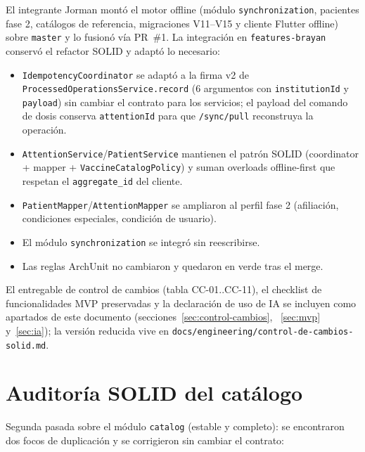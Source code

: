 \documentclass[11pt,a4paper]{article}
\begin{document}
El integrante Jorman montó el motor offline (módulo \texttt{synchronization},
pacientes fase 2, catálogos de referencia, migraciones V11--V15 y cliente
Flutter offline) sobre \texttt{master} y lo fusionó vía PR~\#1. La integración
en \texttt{features-brayan} conservó el refactor SOLID y adaptó lo necesario:

\begin{itemize}
  \item \texttt{IdempotencyCoordinator} se adaptó a la firma v2 de
        \texttt{ProcessedOperationsService.record} (6 argumentos con
        \texttt{institutionId} y \texttt{payload}) sin cambiar el contrato
        para los servicios; el payload del comando de dosis conserva
        \texttt{attentionId} para que \texttt{/sync/pull} reconstruya la
        operación.
  \item \texttt{AttentionService}/\texttt{PatientService} mantienen el patrón
        SOLID (coordinator + mapper + \texttt{VaccineCatalogPolicy}) y suman
        overloads offline-first que respetan el \texttt{aggregate\_id} del
        cliente.
  \item \texttt{PatientMapper}/\texttt{AttentionMapper} se ampliaron al perfil
        fase 2 (afiliación, condiciones especiales, condición de usuario).
  \item El módulo \texttt{synchronization} se integró sin reescribirse.
  \item Las reglas ArchUnit no cambiaron y quedaron en verde tras el merge.
\end{itemize}

El entregable de control de cambios (tabla CC-01..CC-11), el checklist de
funcionalidades MVP preservadas y la declaración de uso de IA se incluyen como
apartados de este documento (secciones~\ref{sec:control-cambios},
~\ref{sec:mvp} y~\ref{sec:ia}); la versión reducida vive en
\texttt{docs/engineering/control-de-cambios-solid.md}.

\section{Auditoría SOLID del catálogo} \label{sec:auditoria-catalogo}

Segunda pasada sobre el módulo \texttt{catalog} (estable y completo): se
encontraron dos focos de duplicación y se corrigieron sin cambiar el contrato:
\end{document}
